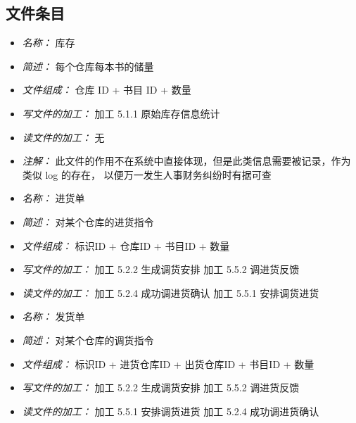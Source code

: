 \vspace{-1mm}

\subsection{文件条目}
\begin{itemize}
\item \textit{名称： }库存
\item \textit{简述： }每个仓库每本书的储量
\item \textit{文件组成： }仓库 ID + 书目 ID + 数量
\item \textit{写文件的加工： }加工 5.1.1 原始库存信息统计
\item \textit{读文件的加工： }无 
\item \textit{注解： }此文件的作用不在系统中直接体现，但是此类信息需要被记录，作为类似 log 的存在， 以便万一发生人事财务纠纷时有据可查

\end{itemize}


\vspace{-1mm}


\begin{itemize}
\item \textit{名称： }进货单
\item \textit{简述： } 对某个仓库的进货指令
\item \textit{文件组成： } 标识ID + 仓库ID + 书目ID + 数量 
\item \textit{写文件的加工： }加工 5.2.2 生成调货安排 加工 5.5.2 调进货反馈 
\item \textit{读文件的加工： }加工 5.2.4 成功调进货确认 加工 5.5.1 安排调货进货

\end{itemize}


\vspace{-1mm}


\begin{itemize}
\item \textit{名称： }发货单
\item \textit{简述： } 对某个仓库的调货指令
\item \textit{文件组成： }标识ID + 进货仓库ID + 出货仓库ID + 书目ID + 数量 
\item \textit{写文件的加工： }加工 5.2.2 生成调货安排 加工 5.5.2 调进货反馈 
\item \textit{读文件的加工： }加工 5.5.1 安排调货进货 加工 5.2.4 成功调进货确认

\end{itemize}


